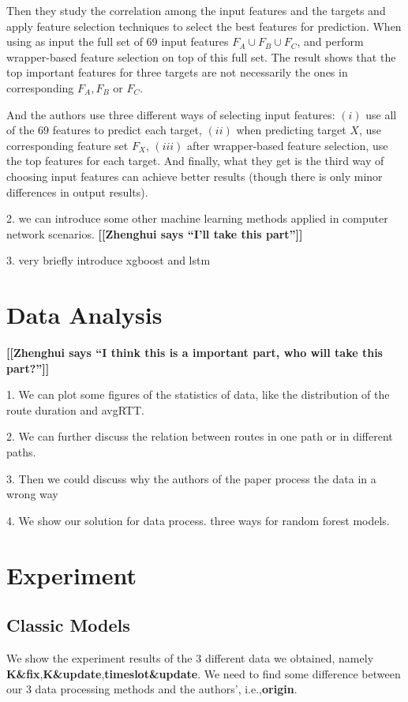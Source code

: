 \documentclass[sigconf]{acmart}
\newcommand{\hui}[1]{{\bf \color{purple} [[Zhenghui says ``#1'']]}}
\begin{document}
	Then they study the correlation among the input features and the targets and apply  feature selection techniques to select the best features for prediction. When using as input the full set of 69 input features $F_A \cup F_B \cup F_C$, and perform wrapper-based feature selection on top of this full set. The result shows that the top important features for three targets are not necessarily the ones in corresponding $F_A,F_B$ or $F_C$.
	
	And the authors use three different ways of selecting input features: $(i)$  use all of the 69 features to predict each target, $(ii)$ when predicting target $X$, use corresponding feature set $F_X$, $(iii)$ after wrapper-based feature selection, use the top features for each target. And finally, what they get is the third way of choosing input features can achieve better results (though there is only minor differences in output results).
	
	
	2. we can introduce some other machine learning methods applied in computer network scenarios. \hui{I'll take this part}
	
	
	3. very briefly introduce xgboost and lstm
	
	\section{Data Analysis}
	\hui{I think this is a important part, who will take this part?}
	
	1. We can plot some figures of the statistics of data, like the distribution of the route duration and avgRTT. 
	
	2. We can further discuss the relation between routes in one path or in different paths.
	
	3. Then we could discuss why the authors of the paper process the data in a wrong way
	
	4. We show our solution for data process. three ways for random forest models.
	
	\section{Experiment}
	\subsection{Classic Models}
	We show the experiment results of the 3 different data we obtained, namely \textbf{K\&fix},\textbf{K\&update},\textbf{timeslot\&update}. We need to find some difference between our 3 data processing methods and the authors', i.e.,\textbf{origin}. 
	
\end{document}
